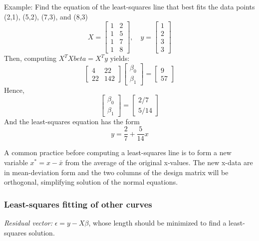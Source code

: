 \documentclass[12pt]{article} %
\begin{document}
Example: Find the equation of the least-squares line that best fits the data points (2,1), (5,2), (7,3), and (8,3)
$$X = \begin{bmatrix}
	1 & 2\\
	1 & 5\\
	1 & 7\\
	1 & 8
\end{bmatrix}, \quad y = \begin{bmatrix}
	1\\
	2\\
	3\\
	3
\end{bmatrix}$$
Then, computing $X^T X beta = X^T y$ yields:
$$\begin{bmatrix}
	4 & 22\\
	22 & 142
\end{bmatrix} \begin{bmatrix}
	\beta_0\\
	\beta_1
\end{bmatrix} = \begin{bmatrix}
	9\\
	57
\end{bmatrix}$$
Hence,
$$\begin{bmatrix}
	\beta_0\\
	\beta_1
\end{bmatrix} = \begin{bmatrix}
	2/7\\
	5/14
\end{bmatrix}$$
And the least-squares equation has the form 
$$y = \frac{2}{7}+ \frac{5}{14}x$$

A common practice before computing a least-squares line is to form a new variable $x^* = x - \bar{x}$ from the average of the original x-values. The new x-data are in mean-deviation form and the two columns of the design matrix will be orthogonal, simplifying solution of the normal equations. 

\subsubsection{Least-squares fitting of other curves}
\emph{Residual vector:} $\epsilon = y - X\beta$, whose length should be minimized to find a least-squares solution.
\end{document}
